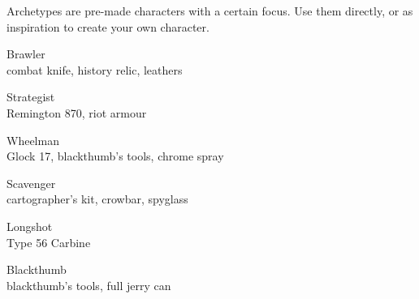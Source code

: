 
Archetypes are pre-made characters with a certain focus. Use them directly, or as inspiration to create your own character.

\vspace*{-1em}
\begin{flushleft}

\begin{multicols}{2}
\begin{describe}{Brawler} \\
   
combat knife, history relic, leathers
\end{describe}

\begin{describe}{Strategist} \\
   
Remington 870, riot armour
\end{describe}
\end{multicols}

\vspace*{-2em}

\begin{multicols}{2}
\begin{describe}{Wheelman} \\
   
Glock 17, blackthumb's tools, chrome spray
\end{describe}

\begin{describe}{Scavenger} \\
   
cartographer's kit, crowbar, spyglass
\end{describe}
\end{multicols}

\vspace*{-2em}

\begin{multicols}{2}
\begin{describe}{Longshot} \\
   
Type 56 Carbine
\end{describe}

\begin{describe}{Blackthumb} \\
   
blackthumb's tools, full jerry can
\end{describe}
\end{multicols}

\end{flushleft}
\vspace*{-2em}
